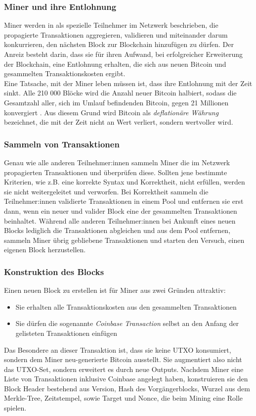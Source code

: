 \subsubsection{Miner und ihre Entlohnung}
Miner werden in \cite{khairuddin_sas_2019} als spezielle Teilnehmer im Netzwerk beschrieben, die propagierte Transaktionen aggregieren, validieren und miteinander darum konkurrieren, den nächsten Block zur Blockchain hinzufügen zu dürfen. 
Der Anreiz besteht darin, dass sie für ihren Aufwand, bei erfolgreicher Erweiterung der Blockchain, eine Entlohnung erhalten, die sich aus neuen Bitcoin und gesammelten Transaktionskosten ergibt.\\
Eine Tatsache, mit der Miner leben müssen ist, dass ihre Entlohnung mit der Zeit sinkt. 
Alle 210 000 Blöcke wird die Anzahl neuer Bitcoin halbiert, sodass die Gesamtzahl aller, sich im Umlauf befindenden Bitcoin, gegen 21 Millionen konvergiert \cite[]{goorha_2019}. 
Aus diesem Grund wird Bitcoin als \emph{deflationäre Währung} bezeichnet, die mit der Zeit nicht an Wert verliert, sondern wertvoller wird.
\subsubsection{Sammeln von Transaktionen}
Genau wie alle anderen Teilnehmer:innen sammeln Miner die im Netzwerk propagierten Transaktionen und überprüfen diese. Sollten jene bestimmte Kriterien, wie z.B. eine korrekte Syntax und Korrektheit, nicht erfüllen, werden sie nicht weitergeleitet und verworfen.
Bei Korrektheit sammeln die Teilnehmer:innen validierte Transaktionen in einem Pool und entfernen sie erst dann, wenn ein neuer und valider Block eine der gesammelten Transaktionen beinhaltet. 
Während alle anderen Teilnehmer:innen bei Ankunft eines neuen Blocks lediglich die Transaktionen abgleichen und aus dem Pool entfernen, sammeln Miner übrig gebliebene Transaktionen und starten den Versuch, einen eigenen Block herzustellen.
\subsubsection{Konstruktion des Blocks}
Einen neuen Block zu erstellen ist für Miner aus zwei Gründen attraktiv:
\begin{itemize}
\item Sie erhalten alle Transaktionskosten aus den gesammelten Transaktionen
\item Sie dürfen die sogenannte \emph{Coinbase Transaction} selbst an den Anfang der gelisteten Transaktionen einfügen
\end{itemize}
Das Besondere an dieser Transaktion ist, dass sie keine UTXO konsumiert, sondern dem Miner neu-generierte Bitcoin ausstellt. Sie augmentiert also nicht das UTXO-Set, sondern erweitert es durch neue Outputs.
Nachdem Miner eine Liste von Transaktionen inklusive Coinbase angelegt haben, konstruieren sie den Block Header bestehend aus Version, Hash des Vorgängerblocks, Wurzel aus dem Merkle-Tree, Zeitstempel, sowie Target und Nonce, die beim Mining eine Rolle spielen.
